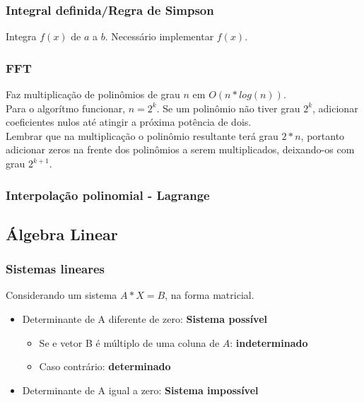 \subsubsection{Integral definida/Regra de Simpson}
Integra $f(x)$ de $a$ a $b$. Necessário implementar $f(x)$.

\divisor

\subsubsection{FFT}
Faz multiplica\c{c}\~{a}o de polin\^{o}mios de grau $n$ em $O(n*log(n))$.\\
Para o algor\'{i}tmo funcionar, $n=2^k$. Se um polin\^{o}mio n\~{a}o tiver grau $2^k$, adicionar coeficientes nulos at\'{e} atingir a pr\'{o}xima pot\^{e}ncia de dois.\\
Lembrar que na multiplica\c{c}\~{a}o o polin\^{o}mio resultante ter\'{a} grau $2*n$, portanto adicionar zeros na frente dos polin\^{o}mios a serem multiplicados, deixando-os com grau $2^{k+1}$.

\divisor

\subsubsection{Interpola\c{c}\~{a}o polinomial - Lagrange}


\subsection{Álgebra Linear}

\subsubsection{Sistemas lineares}
Considerando um sistema $A*X=B$, na forma matricial.
\begin{itemize}
    \item Determinante de A diferente de zero: \textbf{Sistema poss\'{i}vel}
		\begin{itemize}
			\item Se e vetor B \'{e} m\'{u}ltiplo de uma coluna de $A$: \textbf{indeterminado}
			\item Caso contr\'{a}rio: \textbf{determinado}
		\end{itemize}
    \item Determinante de A igual a zero: \textbf{Sistema imposs\'{i}vel}
\end{itemize}


